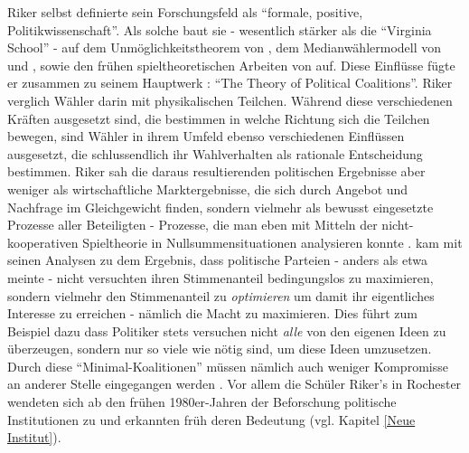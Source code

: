 Riker selbst definierte sein Forschungsfeld als "`formale, positive, Politikwissenschaft"'. Als solche baut sie - wesentlich stärker als die "`Virginia School"' - auf dem Unmöglichkeitstheorem von \textcite{Arrow1951}, dem Medianwählermodell von \textcite{Black1948a} und \textcite{Downs1957}, sowie den frühen spieltheoretischen Arbeiten von \textcite{Morgenstern1944} auf. Diese Einflüsse fügte er zusammen zu seinem Hauptwerk \textcite{Riker1962}: "`The Theory of Political Coalitions"'. Riker verglich Wähler darin mit physikalischen Teilchen. Während diese verschiedenen Kräften ausgesetzt sind, die bestimmen in welche Richtung sich die Teilchen bewegen, sind Wähler in ihrem Umfeld ebenso verschiedenen Einflüssen ausgesetzt, die schlussendlich ihr Wahlverhalten als rationale Entscheidung bestimmen. Riker sah die daraus resultierenden politischen Ergebnisse aber weniger als wirtschaftliche Marktergebnisse, die sich durch Angebot und Nachfrage im Gleichgewicht finden, sondern vielmehr als bewusst eingesetzte Prozesse aller Beteiligten - Prozesse, die man eben mit Mitteln der nicht-kooperativen Spieltheorie in Nullsummensituationen analysieren konnte \textcite[S. 277]{Amadae1999}. \textcite{Riker1962} kam mit seinen Analysen zu dem Ergebnis, dass politische Parteien - anders als etwa \textcite{Downs1957b} meinte - nicht versuchten ihren Stimmenanteil bedingungslos zu maximieren, sondern vielmehr den Stimmenanteil zu \textit{optimieren} um damit ihr eigentliches Interesse zu erreichen - nämlich die Macht zu maximieren. Dies führt zum Beispiel dazu dass Politiker stets versuchen nicht \textit{alle} von den eigenen Ideen zu überzeugen, sondern nur so viele wie nötig sind, um diese Ideen umzusetzen. Durch diese "`Minimal-Koalitionen"' müssen nämlich auch weniger Kompromisse an anderer Stelle eingegangen werden \textcite[S. 277]{Amadae1999}.
Vor allem die Schüler Riker's in Rochester wendeten sich ab den frühen 1980er-Jahren der Beforschung politische Institutionen zu \parencite[S. 284]{Amadae1999} und erkannten früh deren Bedeutung (vgl. Kapitel \ref{Neue Institut}).

